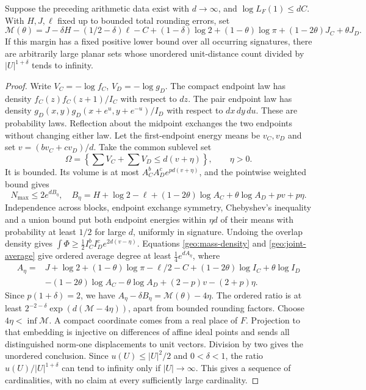 \begin{proposition}\label{geo:transfer}
Suppose the preceding arithmetic data exist with $d\to\infty$, and
$\log L_F(1)\le dC$. With $H,J,\ell$ fixed up to bounded total rounding
errors, set
\begin{equation}\label{geo:general-margin}
 \mathcal M(\theta)=J-\delta H-(1/2-\delta)\ell-C
 +(1-\delta)\log2+(1-\theta)\log\pi
 +(1-2\theta)J_C+\theta J_D.
\end{equation}
If this margin has a fixed positive lower bound over all occurring
signatures, there are arbitrarily large planar sets whose unordered
unit-distance count divided by $|U|^{1+\delta}$ tends to infinity.
\end{proposition}

\begin{proof}
Write $V_C=-\log f_C$, $V_D=-\log g_D$. The compact endpoint law has
density $f_C(z)f_C(z+1)/I_C$ with respect to $dz$. The pair endpoint law
has density $g_D(x,y)g_D(x+e^u,y+e^{-u})/I_D$ with respect to $dx\,dy\,du$.
These are probability laws. Reflection about the midpoint exchanges the
two endpoints without changing either law. Let the first-endpoint energy
means be $v_C,v_D$ and set
$v=(b v_C+c v_D)/d$. Take the common sublevel set
\[
 \Omega=\left\{\sum V_C+\sum V_D\le d(v+\eta)\right\},\qquad\eta>0.
\]
It is bounded. Its volume is at most
$A_C^bA_D^c e^{pd(v+\eta)}$, and the pointwise weighted bound gives
\[
 N_{\max}\le2e^{dB_\eta},\quad
 B_\eta=H+\log2-\ell+(1-2\theta)\log A_C+\theta\log A_D+pv+p\eta.
\]
Independence across blocks, endpoint exchange symmetry, Chebyshev's inequality and a
union bound put both endpoint energies within $\eta d$ of their means
with probability at least $1/2$ for large $d$, uniformly in signature.
Undoing the overlap density gives
$\int\Phi\ge\tfrac12 I_C^b I_D^c e^{2d(v-\eta)}$.
Equations \eqref{geo:mass-density} and \eqref{geo:joint-average}
give ordered average degree at least $\tfrac14e^{dA_\eta}$, where
\[
 \begin{aligned}
 A_\eta={}&J+\log2+(1-\theta)\log\pi-\ell/2-C
 +(1-2\theta)\log I_C+\theta\log I_D\\
 &-(1-2\theta)\log A_C-\theta\log A_D
 +(2-p)v-(2+p)\eta.
 \end{aligned}
\]
Since $p(1+\delta)=2$, we have
$A_\eta-\delta B_\eta=\mathcal M(\theta)-4\eta$.
The ordered ratio is at least
$2^{-2-\delta}\exp(d(\mathcal M-4\eta))$, apart from bounded rounding
factors. Choose $4\eta<\inf\mathcal M$.
A compact coordinate comes from a real place of $F$. Projection to that
embedding is injective on differences of affine ideal points and sends
all distinguished norm-one displacements to unit vectors. Division by two
gives the unordered conclusion. Since $u(U)\le |U|^2/2$ and
$0<\delta<1$, the ratio $u(U)/|U|^{1+\delta}$ can tend to infinity only
if $|U|\to\infty$. This gives a sequence of cardinalities, with no claim
at every sufficiently large cardinality.
\end{proof}
